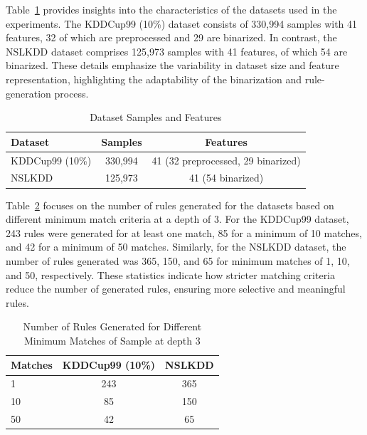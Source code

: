 \documentclass[pdflatex,sn-mathphys-num]{sn-jnl}%
\let\oldcaption\caption
\renewcommand{\caption}[1]{\oldcaption{\centering #1}}
\theoremstyle{thmstyleone}%
\theoremstyle{thmstyletwo}%
\theoremstyle{thmstylethree}%
\begin{document}
Table~\ref{tab:Dataset_Samples} provides insights into the characteristics of the datasets used in the experiments.
The KDDCup99 (10\%) dataset consists of 330,994 samples with 41 features, 32 of which are preprocessed and 29 are binarized.
In contrast, the NSLKDD dataset comprises 125,973 samples with 41 features, of which 54 are binarized.
These details emphasize the variability in dataset size and feature representation, highlighting the adaptability of the binarization and rule-generation process.

\begin{table}[ht!]
    \centering
    \caption{Dataset Samples and Features}
    \begin{tabular}{lcc}
    \toprule
    \textbf{Dataset} & \textbf{Samples} & \textbf{Features} \\
    \midrule
    KDDCup99 (10\%) & 330,994 & 41 (32 preprocessed, 29 binarized) \\
    NSLKDD & 125,973 & 41 (54 binarized) \\
    \bottomrule
    \end{tabular}
    \label{tab:Dataset_Samples}
\end{table}

Table~\ref{tab:Rules_Generated} focuses on the number of rules generated for the datasets based on different minimum match criteria at a depth of 3.
For the KDDCup99 dataset, 243 rules were generated for at least one match, 85 for a minimum of 10 matches, and 42 for a minimum of 50 matches.
Similarly, for the NSLKDD dataset, the number of rules generated was 365, 150, and 65 for minimum matches of 1, 10, and 50, respectively.
These statistics indicate how stricter matching criteria reduce the number of generated rules, ensuring more selective and meaningful rules.

\begin{table}[ht!]
    \centering
    \caption{Number of Rules Generated for Different Minimum Matches of Sample at depth 3}
    \begin{tabular}{lcc}
    \toprule
    \textbf{Matches} & \textbf{KDDCup99 (10\%)} & \textbf{NSLKDD} \\
    \midrule
    1 & 243 & 365 \\
    10 & 85 & 150 \\
    50 & 42 & 65 \\
    \bottomrule
    \end{tabular}
    \label{tab:Rules_Generated}
\end{table}
\end{document}
